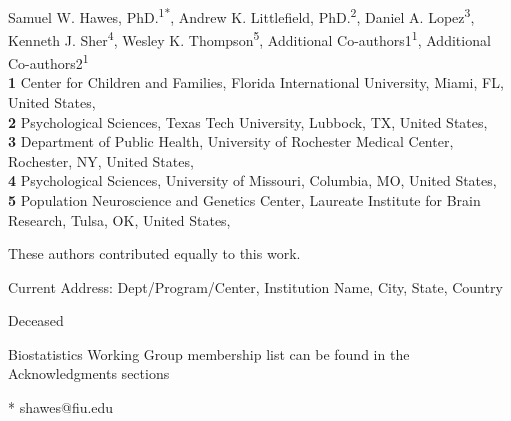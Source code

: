 \documentclass[
  10pt,
  letterpaper,
]{article}
\begin{document}
\vspace*{0.2in}

\begin{flushleft}
{\Large
\textbf{} %
}
\newline
\\
Samuel W. Hawes, PhD.\textsuperscript{1*}, Andrew K. Littlefield,
PhD.\textsuperscript{2}, Daniel A. Lopez\textsuperscript{3}, Kenneth J.
Sher\textsuperscript{4}, Wesley K.
Thompson\textsuperscript{5}, Additional
Co-authors1\textsuperscript{1}, Additional
Co-authors2\textsuperscript{1}
\\
\bigskip
\textbf{1} Center for Children and Families, Florida International
University, Miami, FL, United States, \\ \textbf{2} Psychological
Sciences, Texas Tech University, Lubbock, TX, United
States, \\ \textbf{3} Department of Public Health, University of
Rochester Medical Center, Rochester, NY, United
States, \\ \textbf{4} Psychological Sciences, University of
Missouri, Columbia, MO, United States, \\ \textbf{5} Population
Neuroscience and Genetics Center, Laureate Institute for Brain
Research, Tulsa, OK, United States, 
\bigskip

% 
%
\Yinyang These authors contributed equally to this work.


\textcurrency Current Address: Dept/Program/Center, Institution Name, City, State, Country %

\dag Deceased

\textpilcrow Biostatistics Working Group membership list can be found in
the Acknowledgments sections

* shawes@fiu.edu

\end{flushleft}
\end{document}
